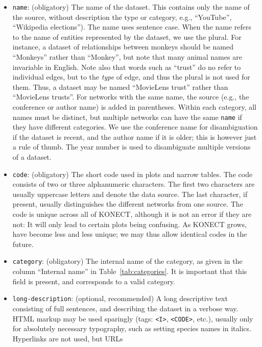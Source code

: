 \documentclass{article}
\begin{document}
\begin{itemize}
\item \texttt{name}: (obligatory) The name of the dataset.  This contains only the
  name of the source, without description the type or category,
  e.g., ``YouTube'', ``Wikipedia elections'').  The name uses
  sentence case.
  When the name refers to the name of entities represented by the
  dataset, we use the plural.  
  For instance, a dataset of relationships between monkeys should be named ``Monkeys'' rather than ``Monkey'',
  but note that many animal names are invariable in English.  
  Note also that words such as ``trust'' do no refer to individual
  edges, but to the \emph{type} of edge, and thus the plural is not used
  for them.  Thus, a dataset may be named ``MovieLens trust'' rather
  than ``MovieLens trusts''. 
  For networks with the same name, the source (e.g.,
  the conference or author name) is added in parentheses.  Within each category,
  all names must be distinct, but multiple networks can have the same
  \texttt{name} if they have different categories.  We use the
  conference name for disambiguation if the dataset is recent, and the
  author name if it is older; this is however just a rule of thumb.  The
  year number is used to disambiguate multiple versions of a dataset. 
\item \texttt{code}: (obligatory) The short code used in plots and narrow
  tables.  The code consists of two or three alphanumeric characters.  The first
  two characters are usually uppercase letters and denote the data
  source.  The last character, if present, usually distinguishes
  the different networks from one source.  The code is unique across all
  of KONECT, although it is not an error if they are not:  It will only
  lead to certain plots being confusing.  As KONECT grows, have become
  less and less unique; we may thus allow identical codes in the
  future. 
\item \texttt{category}: (obligatory) The internal name of the category, as given in the
  column ``Internal name'' in Table~\ref{tab:categories}.
  It is important that this field is present, and corresponds to a valid
  category. 
\item \texttt{long-description}: (optional, recommended) A long descriptive
  text consisting of full sentences, and describing the dataset in
  a verbose way.  HTML markup may be used sparingly (tags: \texttt{<I>}, \texttt{<CODE>},
  etc.), usually only for absolutely necessary typography, such as
  setting species names in italics.  Hyperlinks are not used, but URLs

\end{itemize}
\end{document}
